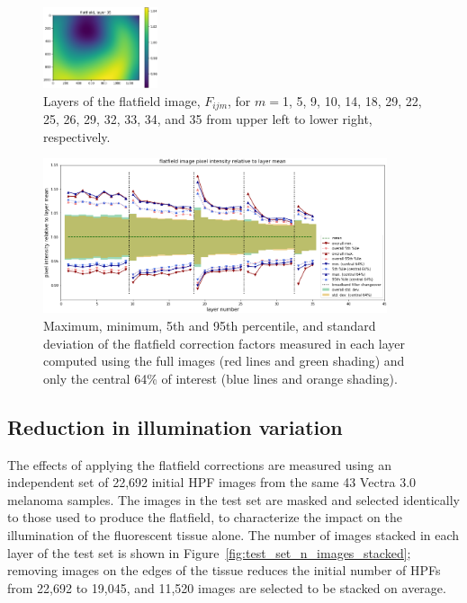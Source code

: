 \documentclass[letterpaper,11pt]{article}
\newcommand{\reffig}[1]{Figure~\ref{#1}}
\begin{document}
\begin{figure}[!ht]
\includegraphics[width=0.3\textwidth]{images/results/flatfield_layers/flatfield_layer_35}
\caption{\footnotesize Layers of the flatfield image, $F_{ijm}$, for $m=$1, 5, 9, 10, 14, 18, 29, 22, 25, 26, 29, 32, 33, 34, and 35 from upper left to lower right, respectively.}
\label{fig:flatfield_image_layers}
\end{figure}

\begin{figure}[!ht]
\centering
\includegraphics[width=0.90\textwidth]{images/results/flatfield_pixel_intensities}
\caption{\footnotesize Maximum, minimum, 5th and 95th percentile, and standard deviation of the flatfield correction factors measured in each layer computed using the full images (red lines and green shading) and only the central 64\% of interest (blue lines and orange shading).}
\label{fig:flatfield_pixel_intensities}
\end{figure} 

\subsection{Reduction in illumination variation}
\label{ssec:reduction_in_illumination_variation}

The effects of applying the flatfield corrections are measured using an independent set of 22,692 initial HPF images from the same 43 Vectra 3.0 melanoma samples. The images in the test set are masked and selected identically to those used to produce the flatfield, to characterize the impact on the illumination of the fluorescent tissue alone. The number of images stacked in each layer of the test set is shown in \reffig{fig:test_set_n_images_stacked}; removing images on the edges of the tissue reduces the initial number of HPFs from 22,692 to 19,045, and 11,520 images are selected to be stacked on average.
\end{document}
